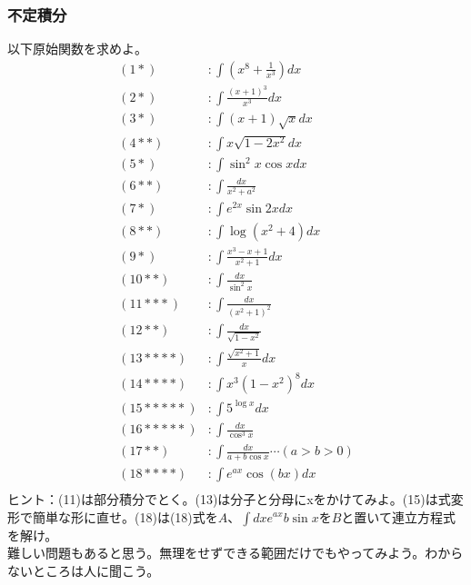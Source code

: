 \documentclass[a4j,dvipdfmx]{jsarticle}
\begin{document}
\subsubsection*{不定積分}
以下原始関数を求めよ。
\begin{align*}
    (1*)&:\int(x^8+\frac{1}{x^3})dx\\
    (2*)&:\int\frac{(x+1)^3}{x^3}dx\\
    (3*)&:\int(x+1)\sqrt{x}dx\\
    (4**)&:\int x\sqrt{1-2x^2}dx\\
    (5*)&:\int \sin^2 x\cos x dx\\
    (6**)&:\int \frac{dx}{x^2+a^2}\\
    (7*)&:\int e^{2x}\sin 2x dx\\
    (8**)&:\int \log(x^2+4)dx\\
    (9*)&:\int\frac{x^3-x+1}{x^2+1}dx\\
    (10**)&:\int\frac{dx}{\sin^2 x}\\
    (11***)&:\int\frac{dx}{(x^2+1)^2}\\
    (12**)&:\int \frac{dx}{\sqrt{1-x^2}}\\
    (13****)&:\int\frac{\sqrt{x^2+1}}{x}dx\\
    (14****)&:\int x^3(1-x^2)^8dx\\
    (15*****)&:\int 5^{\log x}dx\\
    (16*****)&:\int\frac{dx}{\cos^3x}\\
    (17**)&:\int\frac{dx}{a+b\cos x}\cdots(a>b>0)\\
    (18****)&:\int e^{ax}\cos(bx)dx\\
\end{align*}
\scriptsize
ヒント：(11)は部分積分でとく。(13)は分子と分母にxをかけてみよ。(15)は式変形で簡単な形に直せ。(18)は(18)式を$A$、$\int dx e^{ax}b\sin x$を$B$と置いて連立方程式を解け。
\\
\normalsize
難しい問題もあると思う。無理をせずできる範囲だけでもやってみよう。わからないところは人に聞こう。
\newpage
\end{document}
